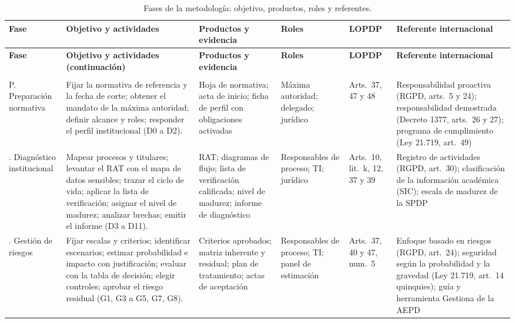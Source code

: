 {\scriptsize
\renewcommand{\arraystretch}{1.15}
\begin{xltabular}{\textwidth}{|>{\raggedright\arraybackslash}p{1.6cm}|L|>{\raggedright\arraybackslash}p{2.5cm}|>{\raggedright\arraybackslash}p{1.9cm}|>{\raggedright\arraybackslash}p{1.5cm}|>{\raggedright\arraybackslash}p{2.4cm}|}
  \caption{Fases de la metodología: objetivo, productos, roles y referentes.}
  \label{tab:fases_detalle} \\
  \hline
  \textbf{Fase} & \textbf{Objetivo y actividades} & \textbf{Productos y evidencia} & \textbf{Roles} & \textbf{LOPDP} & \textbf{Referente internacional} \\
  \hline
  \endfirsthead
  \hline
  \textbf{Fase} & \textbf{Objetivo y actividades (continuación)} & \textbf{Productos y evidencia} & \textbf{Roles} & \textbf{LOPDP} & \textbf{Referente internacional} \\
  \hline
  \endhead
  \hline
   \\
  \endfoot
  \hline
  \endlastfoot
  P. Preparación normativa & Fijar la normativa de referencia y la fecha de corte; obtener el mandato de la máxima autoridad; definir alcance y roles; responder el perfil institucional (D0 a D2). & Hoja de normativa; acta de inicio; ficha de perfil con obligaciones activadas & Máxima autoridad; delegado; jurídico & Arts.~37, 47 y 48 & Responsabilidad proactiva (RGPD, arts.~5 y 24); responsabilidad demostrada (Decreto 1377, arts.~26 y 27); programa de cumplimiento (Ley 21.719, art.~49) \cite{rgpd2016,colombia2013decreto1377,chile2024ley21719} \\ . Diagnóstico institucional & Mapear procesos y titulares; levantar el RAT con el mapa de datos sensibles; trazar el ciclo de vida; aplicar la lista de verificación; asignar el nivel de madurez; analizar brechas; emitir el informe (D3 a D11). & RAT; diagramas de flujo; lista de verificación calificada; nivel de madurez; informe de diagnóstico & Responsables de proceso; TI; jurídico & Arts.~10, lit.~k, 12, 37 y 39 & Registro de actividades (RGPD, art.~30); clasificación de la información académica (SIC); escala de madurez de la SPDP \cite{rgpd2016,sic2026universitario,spdp2025diseno} \\ . Gestión de riesgos & Fijar escalas y criterios; identificar escenarios; estimar probabilidad e impacto con justificación; evaluar con la tabla de decisión; elegir controles; aprobar el riesgo residual (G1, G3 a G5, G7, G8). & Criterios aprobados; matriz inherente y residual; plan de tratamiento; actas de aceptación & Responsables de proceso; TI; panel de estimación & Arts.~37, 40 y 47, num.~5 & Enfoque basado en riesgos (RGPD, art.~24); seguridad según la probabilidad y la gravedad (Ley 21.719, art.~14 quinquies); guía y herramienta Gestiona de la AEPD \cite{rgpd2016,chile2024ley21719,aepd2021riesgo,aepd2024gestiona} \\ \hline

\end{xltabular}}
